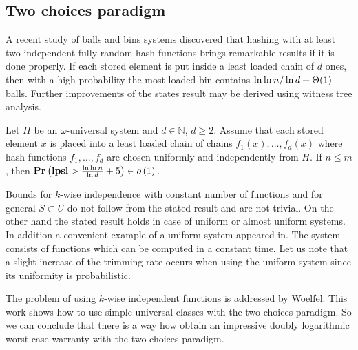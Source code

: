 \subsection{Two choices paradigm}
A recent study\cite{DBLP:conf/stoc/AzarBKU94} of balls and bins systems discovered that hashing with at least two independent fully random hash functions brings remarkable results if it is done properly. 
If each stored element is put inside a least loaded chain of $d$ ones, then with a high probability the most loaded bin contains ${\ln \ln n}/\ln d + \mathrm{\Theta}(1)$ balls.
Further improvements of the states result may be derived using witness tree analysis\cite{DBLP:journals/jacm/Vocking03}. 

\begin{theorem}
\label{theorem-universal-hashing-two-choices}
Let $H$ be an $\omega$-universal system and $d \in \mathbb{N}$, $d \geq 2$. Assume that each stored element $x$ is placed into a least loaded chain of chains $f_1(x), \dots, f_d(x)$ where hash functions $f_1, \dots, f_d$ are chosen uniformly and independently from $H$. If $n \leq m$, then $\mathbf{Pr}\left(\mathbf{lpsl} > \frac{\ln \ln n}{\ln d} + 5\right) \in o\left(1\right).$
\end{theorem}

Bounds for $k$-wise independence with constant number of functions and for general $S \subset U$ do not follow from the stated result and are not trivial.
On the other hand the stated result holds in case of uniform or almost uniform systems.
In addition a convenient example of a uniform system appeared in\cite{DBLP:journals/siamcomp/PaghP08}.
The system consists of functions which can be computed in a constant time. 
Let us note that a slight increase of the trimming rate occurs when using the uniform system since its uniformity is probabilistic.

The problem of using $k$-wise independent functions is addressed by Woelfel\cite{InProc-Woe2006a}. 
This work shows how to use simple universal classes with the two choices paradigm.
So we can conclude that there is a way how obtain an impressive doubly logarithmic worst case warranty with the two choices paradigm.
